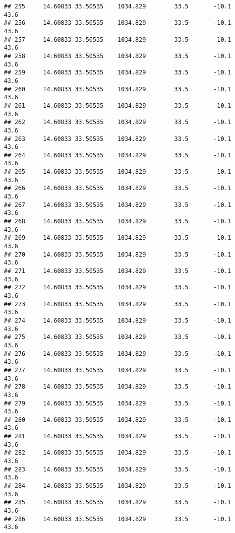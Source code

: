 \documentclass[]{article}
\begin{document}
\begin{verbatim}
## 255     14.60833 33.50535    1034.829        33.5       -10.1              43.6
## 256     14.60833 33.50535    1034.829        33.5       -10.1              43.6
## 257     14.60833 33.50535    1034.829        33.5       -10.1              43.6
## 258     14.60833 33.50535    1034.829        33.5       -10.1              43.6
## 259     14.60833 33.50535    1034.829        33.5       -10.1              43.6
## 260     14.60833 33.50535    1034.829        33.5       -10.1              43.6
## 261     14.60833 33.50535    1034.829        33.5       -10.1              43.6
## 262     14.60833 33.50535    1034.829        33.5       -10.1              43.6
## 263     14.60833 33.50535    1034.829        33.5       -10.1              43.6
## 264     14.60833 33.50535    1034.829        33.5       -10.1              43.6
## 265     14.60833 33.50535    1034.829        33.5       -10.1              43.6
## 266     14.60833 33.50535    1034.829        33.5       -10.1              43.6
## 267     14.60833 33.50535    1034.829        33.5       -10.1              43.6
## 268     14.60833 33.50535    1034.829        33.5       -10.1              43.6
## 269     14.60833 33.50535    1034.829        33.5       -10.1              43.6
## 270     14.60833 33.50535    1034.829        33.5       -10.1              43.6
## 271     14.60833 33.50535    1034.829        33.5       -10.1              43.6
## 272     14.60833 33.50535    1034.829        33.5       -10.1              43.6
## 273     14.60833 33.50535    1034.829        33.5       -10.1              43.6
## 274     14.60833 33.50535    1034.829        33.5       -10.1              43.6
## 275     14.60833 33.50535    1034.829        33.5       -10.1              43.6
## 276     14.60833 33.50535    1034.829        33.5       -10.1              43.6
## 277     14.60833 33.50535    1034.829        33.5       -10.1              43.6
## 278     14.60833 33.50535    1034.829        33.5       -10.1              43.6
## 279     14.60833 33.50535    1034.829        33.5       -10.1              43.6
## 280     14.60833 33.50535    1034.829        33.5       -10.1              43.6
## 281     14.60833 33.50535    1034.829        33.5       -10.1              43.6
## 282     14.60833 33.50535    1034.829        33.5       -10.1              43.6
## 283     14.60833 33.50535    1034.829        33.5       -10.1              43.6
## 284     14.60833 33.50535    1034.829        33.5       -10.1              43.6
## 285     14.60833 33.50535    1034.829        33.5       -10.1              43.6
## 286     14.60833 33.50535    1034.829        33.5       -10.1              43.6

\end{verbatim}
\end{document}
